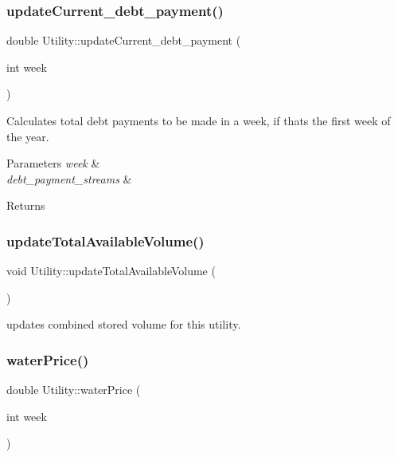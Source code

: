 \subsubsection{\texorpdfstring{update\+Current\+\_\+debt\+\_\+payment()}{updateCurrent\_debt\_payment()}}
{\footnotesize\ttfamily double Utility\+::update\+Current\+\_\+debt\+\_\+payment (\begin{DoxyParamCaption}\item[{int}]{week }\end{DoxyParamCaption})}

Calculates total debt payments to be made in a week, if that\textquotesingle{}s the first week of the year. 
\begin{DoxyParams}{Parameters}
{\em week} & \\
\hline
{\em debt\+\_\+payment\+\_\+streams} & \\
\hline
\end{DoxyParams}
\begin{DoxyReturn}{Returns}

\end{DoxyReturn}
\mbox{\label{classUtility_af394fe9f04a371a7cf10ddadba575e85_af394fe9f04a371a7cf10ddadba575e85}} 
\subsubsection{\texorpdfstring{update\+Total\+Available\+Volume()}{updateTotalAvailableVolume()}}
{\footnotesize\ttfamily void Utility\+::update\+Total\+Available\+Volume (\begin{DoxyParamCaption}{ }\end{DoxyParamCaption})}

updates combined stored volume for this utility. \mbox{\label{classUtility_a0dca2586b9ed761cdab3b0a344daf21c_a0dca2586b9ed761cdab3b0a344daf21c}} 
\subsubsection{\texorpdfstring{water\+Price()}{waterPrice()}}
{\footnotesize\ttfamily double Utility\+::water\+Price (\begin{DoxyParamCaption}\item[{int}]{week }\end{DoxyParamCaption})}




